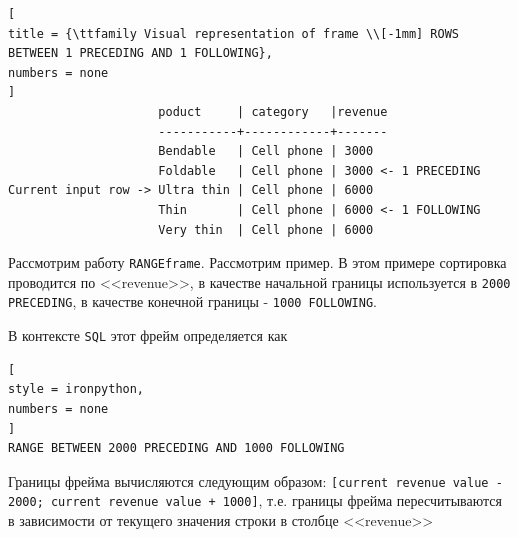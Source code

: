 \documentclass[%
	11pt,
	a4paper,
	utf8,
		]{article}
\begin{document}
\begin{lstlisting}[
title = {\ttfamily Visual representation of frame \\[-1mm] ROWS BETWEEN 1 PRECEDING AND 1 FOLLOWING},
numbers = none
]
                     poduct     | category   |revenue
                     -----------+------------+-------
                     Bendable   | Cell phone | 3000
                     Foldable   | Cell phone | 3000 <- 1 PRECEDING
Current input row -> Ultra thin | Cell phone | 6000
                     Thin       | Cell phone | 6000 <- 1 FOLLOWING
                     Very thin  | Cell phone | 6000
\end{lstlisting}

Рассмотрим работу \texttt{RANGEframe}. Рассмотрим пример. В этом примере сортировка проводится по <<revenue>>, в качестве начальной границы используется в \texttt{2000 PRECEDING}, в качестве конечной границы - \texttt{1000 FOLLOWING}.

В контексте \texttt{SQL} этот фрейм определяется как

\begin{lstlisting}[
style = ironpython,
numbers = none
]
RANGE BETWEEN 2000 PRECEDING AND 1000 FOLLOWING
\end{lstlisting}

Границы фрейма вычисляются следующим образом: \texttt{[current revenue value - 2000; current revenue value + 1000]}, т.е. границы фрейма пересчитываются в зависимости от текущего значения строки в столбце <<revenue>>
\end{document}
